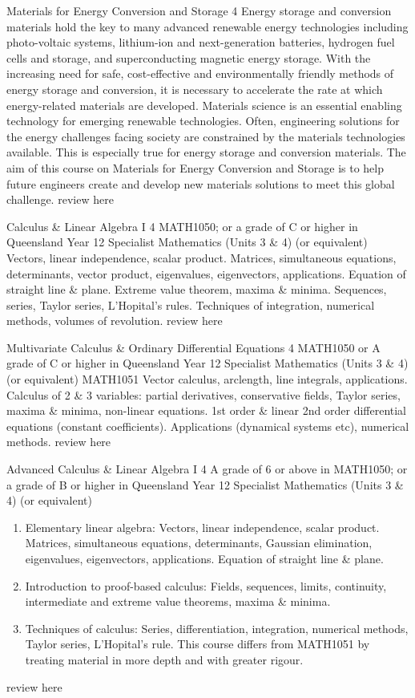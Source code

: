 	{Materials for Energy Conversion and Storage}
	{4}
	{}
	{}
	{}
	{Energy storage and conversion materials hold the key to many advanced renewable energy technologies including photo-voltaic systems, lithium-ion and next-generation batteries, hydrogen fuel cells and storage, and superconducting magnetic energy storage. With the increasing need for safe, cost-effective and environmentally friendly methods of energy storage and conversion, it is necessary to accelerate the rate at which energy-related materials are developed. Materials science is an essential enabling technology for emerging renewable technologies. Often, engineering solutions for the energy challenges facing society are constrained by the materials technologies available. This is especially true for energy storage and conversion materials. The aim of this course on Materials for Energy Conversion and Storage is to help future engineers create and develop new materials solutions to meet this global challenge.}
	{review here}

	{Calculus \& Linear Algebra I}
	{4}
	{MATH1050; or a grade of C or higher in Queensland Year 12 Specialist Mathematics (Units 3 \& 4) (or equivalent)}
	{}
	{}
	{Vectors, linear independence, scalar product. Matrices, simultaneous equations, determinants, vector product, eigenvalues, eigenvectors, applications. Equation of straight line \& plane. Extreme value theorem, maxima \& minima. Sequences, series, Taylor series, L'Hopital's rules. Techniques of integration, numerical methods, volumes of revolution.}
	{review here}

	{Multivariate Calculus \& Ordinary Differential Equations}
	{4}
	{MATH1050 or A grade of C or higher in Queensland Year 12 Specialist Mathematics (Units 3 \& 4) (or equivalent)}
	{MATH1051}
	{}
	{Vector calculus, arclength, line integrals, applications. Calculus of 2 \& 3 variables: partial derivatives, conservative fields, Taylor series, maxima \& minima, non-linear equations. 1st order \& linear 2nd order differential equations (constant coefficients). Applications (dynamical systems etc), numerical methods.}
	{review here}

	{Advanced Calculus \& Linear Algebra I}
	{4}
	{A grade of 6 or above in MATH1050; or a grade of B or higher in Queensland Year 12 Specialist Mathematics (Units 3 \& 4) (or equivalent)}
	{}
	{}
	{\begin{enumerate}
    \item Elementary linear algebra: Vectors, linear independence, scalar product. Matrices, simultaneous equations, determinants, Gaussian elimination, eigenvalues, eigenvectors, applications. Equation of straight line \& plane.
    \item Introduction to proof-based calculus: Fields, sequences, limits, continuity, intermediate and extreme value theorems, maxima \& minima.
    \item Techniques of calculus: Series, differentiation, integration, numerical methods, Taylor series, L'Hopital's rule. This course differs from MATH1051 by treating material in more depth and with greater rigour.
\end{enumerate}}
	{review here}

